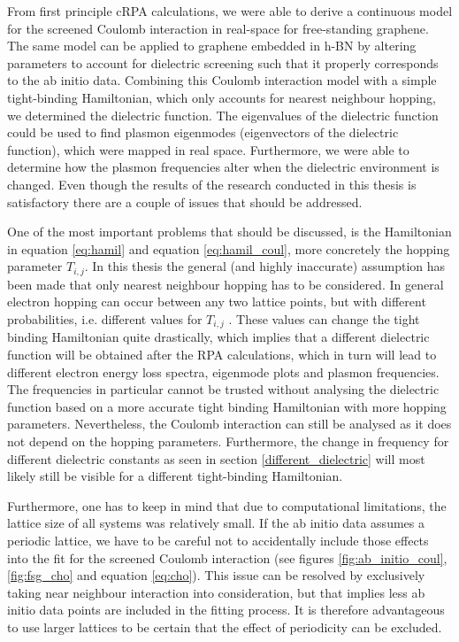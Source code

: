 
From first principle cRPA calculations, we were able to derive a continuous model for the screened Coulomb interaction in real-space for free-standing graphene. The same model can be applied to graphene embedded in h-BN by altering parameters to account for dielectric screening such that it properly corresponds to the ab initio data. Combining this Coulomb interaction model with a simple tight-binding Hamiltonian, which only accounts for nearest neighbour hopping, we determined the dielectric function. The eigenvalues of the dielectric function could be used to find plasmon eigenmodes (eigenvectors of the dielectric function), which were mapped in real space. Furthermore, we were able to determine how the plasmon frequencies alter when the dielectric environment is changed. Even though the results of the research conducted in this thesis is satisfactory there are a couple of issues that should be addressed. \medskip

One of the most important problems that should be discussed, is the Hamiltonian in equation \ref{eq:hamil} and equation \ref{eq:hamil_coul}, more concretely the hopping parameter $T_{i,j}$. In this thesis the general (and highly inaccurate) assumption has been made that only nearest neighbour hopping has to be considered. In general electron hopping can occur between any two lattice points, but with different probabilities, i.e. different values for $T_{i,j}$ \cite{Westerhout2021}. These values can change the tight binding Hamiltonian quite drastically, which implies that a different dielectric function will be obtained after the RPA calculations, which in turn will lead to different electron energy loss spectra, eigenmode plots and plasmon frequencies. The frequencies in particular cannot be trusted without analysing the dielectric function based on a more accurate tight binding Hamiltonian with more hopping parameters. Nevertheless, the Coulomb interaction can still be analysed as it does not depend on the hopping parameters. Furthermore, the change in frequency for different dielectric constants as seen in section \ref{different_dielectric} will most likely still be visible for a different tight-binding Hamiltonian.\medskip

Furthermore, one has to keep in mind that due to computational limitations, the lattice size of all systems was relatively small. If the ab initio data assumes a periodic lattice, we have to be careful not to accidentally include those effects into the fit for the screened Coulomb interaction (see figures \ref{fig:ab_initio_coul}, \ref{fig:fsg_cho} and equation \ref{eq:cho}). This issue can be resolved by exclusively taking near neighbour interaction into consideration, but that implies less ab initio data points are included in the fitting process. It is therefore advantageous to use larger lattices to be certain that the effect of periodicity can be excluded.\medskip

